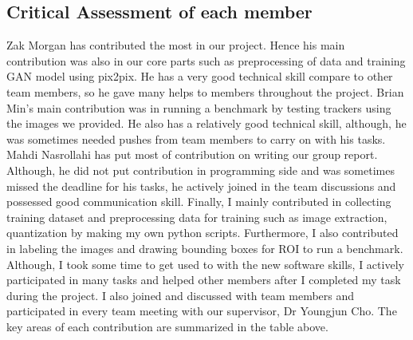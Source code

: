 \documentclass[conference]{IEEEtran}
\begin{document}
\subsection{Critical Assessment of each member}
\begin{table}[htbp]
\begin{center}
\label{tab1}
\end{center}
\end{table}
Zak Morgan has contributed the most in our project. Hence his main contribution was also in our core parts such as preprocessing of data and training GAN model using pix2pix. He has a very good technical skill compare to other team members, so he gave many helps to members throughout the project.
Brian Min’s main contribution was in running a benchmark by testing trackers using the images we provided. He also has a relatively good technical skill, although, he was sometimes needed pushes from team members to carry on with his tasks. Mahdi Nasrollahi has put most of contribution on writing our group report. Although, he did not put contribution in programming side and was sometimes missed the deadline for his tasks, he actively joined in the team discussions and possessed good communication skill.
Finally, I mainly contributed in collecting training dataset and preprocessing data for training such as image extraction, quantization by making my own python scripts. Furthermore, I also contributed in labeling the images and drawing bounding boxes for ROI to run a benchmark. Although, I took some time to get used to with the new software skills, I actively participated in many tasks and helped other members after I completed my task during the project. I also joined and discussed with team members and participated in every team meeting with our supervisor, Dr Youngjun Cho. The key areas of each contribution are summarized in the table above. \\
\end{document}
